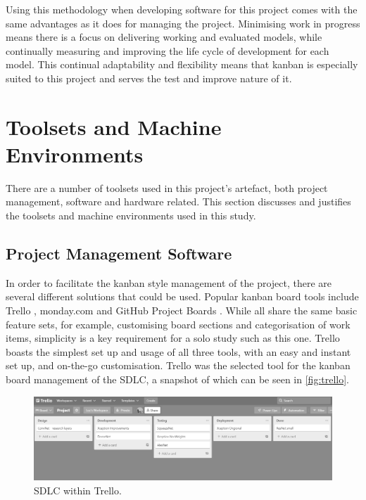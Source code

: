 Using this methodology when developing software for this project comes with the same advantages as it does for managing the project. Minimising work in progress means there is a focus on delivering working and evaluated models, while continually measuring and improving the life cycle of development for each model. This continual adaptability and flexibility means that kanban is especially suited to this project and serves the test and improve nature of it.

\section{Toolsets and Machine Environments}
There are a number of toolsets used in this project's artefact, both project management, software and hardware related. This section discusses and justifies the toolsets and machine environments used in this study.

\subsection{Project Management Software}
In order to facilitate the kanban style management of the project, there are several different solutions that could be used. Popular kanban board tools include Trello \citep{Trello41:online}, monday.com \citep{mondayco9:online} and GitHub Project Boards \citep{Aboutpro84:online}. While all share the same basic feature sets, for example, customising board sections and categorisation of work items, simplicity is a key requirement for a solo study such as this one. Trello boasts the simplest set up and usage of all three tools, with an easy and instant set up, and on-the-go customisation. Trello was the selected tool for the kanban board management of the SDLC, a snapshot of which can be seen in \autoref{fig:trello}.

\begin{figure}[H]
    \centering
    \includegraphics[width=\textwidth]{figures/trello.png}
    \caption{SDLC within Trello.}
    \label{fig:trello}
\end{figure}

